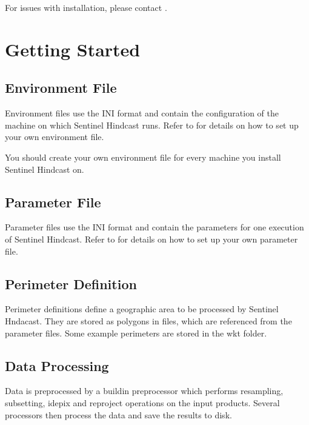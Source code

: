 \documentclass[letterpaper,10pt,english]{sphinxmanual}
\begin{document}
For issues with installation, please contact .


\chapter{Getting Started}
\label{\detokenize{index:getting-started}}

\section{Environment File}
\label{\detokenize{index:environment-file}}
Environment files use the INI format and contain the configuration of
the machine on which Sentinel Hindcast runs. Refer to {\hyperref[\detokenize{environment_config:environments}]{}}
for details on how to set up your own environment file.

You should create your own environment file for every machine you
install Sentinel Hindcast on.


\section{Parameter File}
\label{\detokenize{index:parameter-file}}
Parameter files use the INI format and contain the parameters for one
execution of Sentinel Hindcast. Refer to {\hyperref[\detokenize{parameters_config:parameters}]{}}
for details on how to set up your own parameter file.


\section{Perimeter Definition}
\label{\detokenize{index:perimeter-definition}}
Perimeter definitions define a geographic area to be processed by
Sentinel Hndacast. They are stored as polygons in  files, which
are referenced from the parameter files. Some example perimeters are stored
in the wkt folder.


\section{Data Processing}
\label{\detokenize{index:data-processing}}
Data is preprocessed by a build\sphinxhyphen{}in preprocessor which performs
resampling, subsetting, idepix and reproject operations on the input
products. Several processors then process the data and save the results
to disk.
\end{document}

